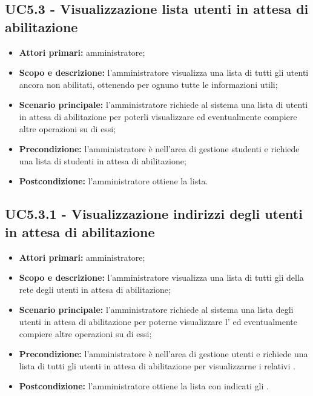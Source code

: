 \documentclass[AnalisiDeiRequisiti.tex]{subfiles}
\begin{document}
\subsection{UC5.3 - Visualizzazione lista utenti in attesa di abilitazione}
\begin{itemize}
	\item \textbf{Attori primari:} amministratore;
	\item \textbf{Scopo e descrizione:} l'amministratore visualizza una lista di tutti gli utenti ancora non abilitati, ottenendo per ognuno tutte le informazioni utili;
	\item \textbf{Scenario principale:} l'amministratore richiede al sistema una lista di utenti in attesa di abilitazione per poterli visualizzare ed eventualmente compiere altre operazioni su di essi;
	\item \textbf{Precondizione:} l'amministratore è nell'area di gestione studenti e richiede una lista di studenti in attesa di abilitazione; 
	\item \textbf{Postcondizione:} l'amministratore ottiene la lista.
\end{itemize}
\subsection{UC5.3.1 - Visualizzazione indirizzi degli utenti in attesa di abilitazione}
\begin{itemize}
	\item \textbf{Attori primari:} amministratore;
	\item \textbf{Scopo e descrizione:} l'amministratore visualizza una lista di tutti gli  della rete  degli utenti in attesa di abilitazione;
	\item \textbf{Scenario principale:} l'amministratore richiede al sistema una lista degli utenti in attesa di abilitazione per poterne visualizzare l' ed eventualmente compiere altre operazioni su di essi;
	\item \textbf{Precondizione:} l'amministratore è nell'area di gestione utenti e richiede una lista di tutti gli utenti in attesa di abilitazione per visualizzarne i relativi .
	\item \textbf{Postcondizione:} l'amministratore ottiene la lista con indicati gli .
\end{itemize}
\end{document}
